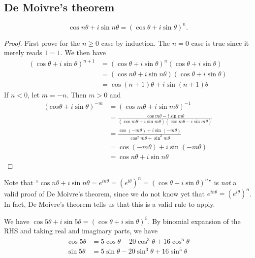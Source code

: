 \documentclass[a4paper]{article}
\begin{document}
\subsection{De Moivre's theorem}
\begin{thm}
  \[
    \cos n\theta + i\sin n\theta = (\cos\theta + i\sin\theta)^n.
  \]
\end{thm}
\begin{proof}
  First prove for the $n \geq 0$ case by induction. The $n = 0$ case is true since it merely reads $1 = 1$. We then have
  \begin{align*}
    (\cos\theta + i\sin\theta)^{n + 1} &= (\cos\theta + i\sin\theta)^n (\cos\theta + i\sin\theta)\\
    &= (\cos n\theta + i\sin n\theta )(\cos\theta + i\sin\theta)\\
    &= \cos(n+1)\theta + i\sin(n+1)\theta
  \end{align*}
  If $n < 0$, let $m = -n$. Then $m > 0$ and
  \begin{align*}
    (cos\theta + i\sin\theta)^{-m} &= (\cos m\theta + i\sin m\theta)^{-1}\\
    &= \frac{\cos m\theta - i\sin m\theta}{(\cos m\theta + i\sin m\theta)(\cos m\theta - i\sin m\theta)}\\
    &= \frac{\cos (-m\theta) + i\sin (-m\theta)}{\cos^2 m\theta + \sin^2 m\theta}\\
    &= \cos (-m\theta) + i\sin (-m\theta)\\
    &= \cos n\theta + i\sin n\theta
  \end{align*}
\end{proof}
Note that ``$\cos n\theta + i\sin n\theta = e^{in\theta} = (e^{i\theta})^n = (\cos \theta + i\sin \theta)^n$'' is \emph{not} a valid proof of De Moivre's theorem, since we do not know yet that $e^{in\theta} = (e^{i\theta})^n$. In fact, De Moivre's theorem tells us that this is a valid rule to apply.

\begin{eg}
  We have $\cos 5\theta + i\sin5\theta = (\cos\theta + i\sin\theta)^5$. By binomial expansion of the RHS and taking real and imaginary parts, we have
  \begin{align*}
    \cos 5\theta &= 5\cos\theta - 20\cos^3\theta + 16\cos^5\theta\\
    \sin 5\theta &= 5\sin\theta - 20\sin^3\theta + 16\sin^5\theta
  \end{align*}
\end{eg}
\end{document}
